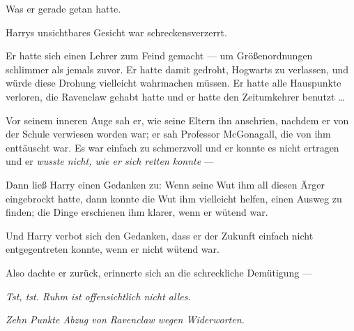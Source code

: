 Was er gerade getan hatte.

Harrys unsichtbares Gesicht war schreckensverzerrt.

Er hatte sich einen Lehrer zum Feind gemacht — um Größenordnungen schlimmer als jemals zuvor. Er hatte damit gedroht, Hogwarts zu verlassen, und würde diese Drohung vielleicht wahrmachen müssen. Er hatte alle Hauspunkte verloren, die Ravenclaw gehabt hatte und er hatte den Zeitumkehrer benutzt …

Vor seinem inneren Auge sah er, wie seine Eltern ihn anschrien, nachdem er von der Schule verwiesen worden war; er sah Professor McGonagall, die von ihm enttäuscht war. Es war einfach zu schmerzvoll und er konnte es nicht ertragen und er \emph{wusste nicht, wie er sich retten konnte} —

Dann ließ Harry einen Gedanken zu: Wenn seine Wut ihm all diesen Ärger eingebrockt hatte, dann konnte die Wut ihm vielleicht helfen, einen Ausweg zu finden; die Dinge erschienen ihm klarer, wenn er wütend war.

Und Harry verbot sich den Gedanken, dass er der Zukunft einfach nicht entgegentreten konnte, wenn er nicht wütend war.

Also dachte er zurück, erinnerte sich an die schreckliche Demütigung —

\emph{Tst, tst. Ruhm ist offensichtlich nicht alles.}

\emph{Zehn Punkte Abzug von Ravenclaw wegen Widerworten.}

